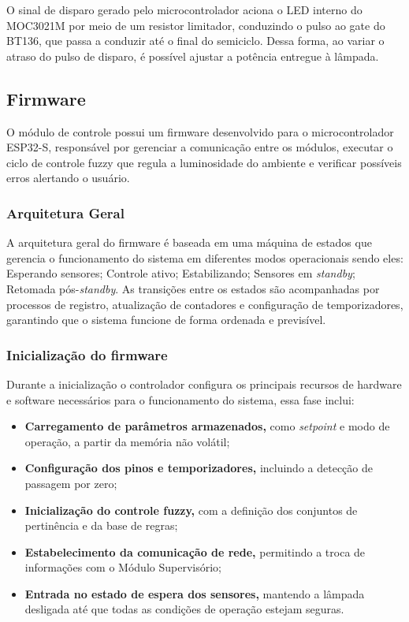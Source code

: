 O sinal de disparo gerado pelo microcontrolador aciona o LED interno do MOC3021M por meio de um resistor limitador, conduzindo o pulso ao gate do BT136, que passa a conduzir até o final do semiciclo. Dessa forma, ao variar o atraso do pulso de disparo, é possível ajustar a potência entregue à lâmpada.

\subsection{Firmware}

O módulo de controle possui um firmware desenvolvido para o microcontrolador ESP32-S, responsável por gerenciar a comunicação entre os módulos, executar o ciclo de controle fuzzy que regula a luminosidade do ambiente e verificar possíveis erros alertando o usuário.

\subsubsection{Arquitetura Geral}

A arquitetura geral do firmware é baseada em uma máquina de estados que gerencia o funcionamento do sistema em diferentes modos operacionais sendo eles: Esperando sensores; Controle ativo; Estabilizando; Sensores em \textit{standby}; Retomada pós-\textit{standby}. As transições entre os estados são acompanhadas por processos de registro, atualização de contadores e configuração de temporizadores, garantindo que o sistema funcione de forma ordenada e previsível.

\subsubsection{Inicialização do firmware}

Durante a inicialização o controlador configura os principais recursos de hardware e software necessários para o funcionamento do sistema, essa fase inclui:
\begin{itemize}
    \item \textbf{Carregamento de parâmetros armazenados,} como \textit{setpoint} e modo de operação, a partir da memória não volátil;
    \item \textbf{Configuração dos pinos e temporizadores,} incluindo a detecção de passagem por zero;
    \item \textbf{Inicialização do controle fuzzy,} com a definição dos conjuntos de pertinência e da base de regras;
    \item \textbf{Estabelecimento da comunicação de rede,} permitindo a troca de informações com o Módulo Supervisório;
    \item \textbf{Entrada no estado de espera dos sensores,} mantendo a lâmpada desligada até que todas as condições de operação estejam seguras.
\end{itemize}

